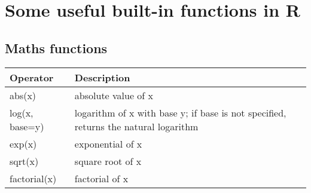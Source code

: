 \documentclass[]{book}
\begin{document}
\hypertarget{some-useful-built-in-functions-in-r}{%
\section{Some useful built-in functions in R}\label{some-useful-built-in-functions-in-r}}

\hypertarget{maths-functions}{%
\subsection{Maths functions}\label{maths-functions}}

\begin{longtable}[]{@{}ll@{}}
\toprule
\begin{minipage}[b]{0.47\columnwidth}\raggedright
Operator\strut
\end{minipage} & \begin{minipage}[b]{0.47\columnwidth}\raggedright
Description\strut
\end{minipage}\tabularnewline
\midrule
\endhead
\begin{minipage}[t]{0.47\columnwidth}\raggedright
abs(x)\strut
\end{minipage} & \begin{minipage}[t]{0.47\columnwidth}\raggedright
absolute value of x\strut
\end{minipage}\tabularnewline
\begin{minipage}[t]{0.47\columnwidth}\raggedright
log(x, base=y)\strut
\end{minipage} & \begin{minipage}[t]{0.47\columnwidth}\raggedright
logarithm of x with base y; if base is not specified, returns the natural logarithm\strut
\end{minipage}\tabularnewline
\begin{minipage}[t]{0.47\columnwidth}\raggedright
exp(x)\strut
\end{minipage} & \begin{minipage}[t]{0.47\columnwidth}\raggedright
exponential of x\strut
\end{minipage}\tabularnewline
\begin{minipage}[t]{0.47\columnwidth}\raggedright
sqrt(x)\strut
\end{minipage} & \begin{minipage}[t]{0.47\columnwidth}\raggedright
square root of x\strut
\end{minipage}\tabularnewline
\begin{minipage}[t]{0.47\columnwidth}\raggedright
factorial(x)\strut
\end{minipage} & \begin{minipage}[t]{0.47\columnwidth}\raggedright
factorial of x\strut
\end{minipage}\tabularnewline
\bottomrule
\end{longtable}
\end{document}
